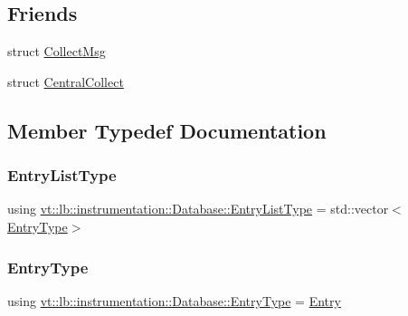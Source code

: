 \subsection*{Friends}
\begin{DoxyCompactItemize}
\item 
struct \hyperlink{structvt_1_1lb_1_1instrumentation_1_1_database_a3775df26b6b7ed805def8013957fd548}{Collect\+Msg}
\item 
struct \hyperlink{structvt_1_1lb_1_1instrumentation_1_1_database_aeab4bdfa8ef385d221a4bb517e4d01fc}{Central\+Collect}
\end{DoxyCompactItemize}


\subsection{Member Typedef Documentation}
\mbox{\label{structvt_1_1lb_1_1instrumentation_1_1_database_af27c1e929c54fd378f84978cbe9360a7}} 
\subsubsection{\texorpdfstring{Entry\+List\+Type}{EntryListType}}
{\footnotesize\ttfamily using \hyperlink{structvt_1_1lb_1_1instrumentation_1_1_database_af27c1e929c54fd378f84978cbe9360a7}{vt\+::lb\+::instrumentation\+::\+Database\+::\+Entry\+List\+Type} =  std\+::vector$<$\hyperlink{structvt_1_1lb_1_1instrumentation_1_1_database_ab04e7d7099af7dd33f4ac1594f8cde32}{Entry\+Type}$>$}

\mbox{\label{structvt_1_1lb_1_1instrumentation_1_1_database_ab04e7d7099af7dd33f4ac1594f8cde32}} 
\subsubsection{\texorpdfstring{Entry\+Type}{EntryType}}
{\footnotesize\ttfamily using \hyperlink{structvt_1_1lb_1_1instrumentation_1_1_database_ab04e7d7099af7dd33f4ac1594f8cde32}{vt\+::lb\+::instrumentation\+::\+Database\+::\+Entry\+Type} =  \hyperlink{structvt_1_1lb_1_1instrumentation_1_1_entry}{Entry}}



